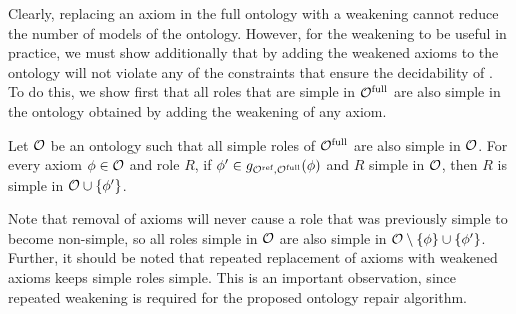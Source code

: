 \documentclass[
]{ceurart}
\begin{document}
Clearly, replacing an axiom in the full ontology with a weakening cannot reduce the number of models of the ontology. However, for the weakening to be useful in practice, we must show additionally that by adding the weakened axioms to the ontology will not violate any of the constraints that ensure the decidability of \SROIQ. To do this, we show first that all roles that are simple in ${\mathcal{O}^\textnormal{full}}$ are also simple in the ontology obtained by adding the weakening of any axiom.

\begin{lemma} \label{lem:simple-roles}
  Let $\mathcal{O}$ be an ontology such that all simple roles of ${\mathcal{O}^\textnormal{full}}$ are also simple in $\mathcal{O}$. For every axiom $\phi \in \mathcal{O}$ and role $R$, if $\phi' \in g_{{\mathcal{O}^\textnormal{ref}},{\mathcal{O}^\textnormal{full}}}(\phi)$ and $R$ simple in $\mathcal{O}$, then $R$ is simple in $\mathcal{O} \cup \{ \phi' \}$.
\end{lemma}


Note that removal of axioms will never cause a role that was previously simple to become non-simple, so all roles simple in $\mathcal{O}$ are also simple in $\mathcal{O} \setminus \{ \phi \} \cup\{ \phi' \}$. Further, it should be noted that repeated replacement of axioms with weakened axioms keeps simple roles simple. This is an important observation, since repeated weakening is required for the proposed ontology repair algorithm.
\end{document}
